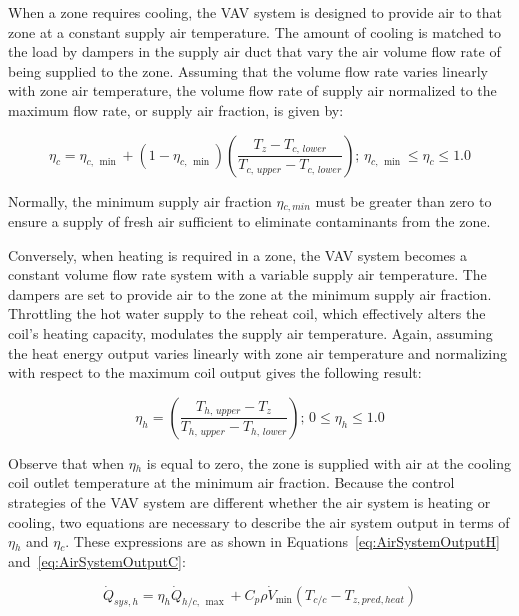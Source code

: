 When a zone requires cooling, the VAV system is designed to provide air to that zone at a constant supply air temperature. The amount of cooling is matched to the load by dampers in the supply air duct that vary the air volume flow rate of being supplied to the zone. Assuming that the volume flow rate varies linearly with zone air temperature, the volume flow rate of supply air normalized to the maximum flow rate, or supply air fraction, is given by:

\begin{equation}
{\eta_c} = {\eta_{c,\,\min }} + \left( {1 - {\eta_{c,\,\min }}} \right)\left( {\frac{{{T_z} - {T_{c,\,lower}}}}{{{T_{c,\,upper}} - {T_{c,\,lower}}}}} \right);\,{\eta_{c,\,\min }} \le {\eta_c} \le 1.0
\label{eq:NormalizedSupplyAirFlowC}
\end{equation}

Normally, the minimum supply air fraction $\eta$\(_{c,min}\) must be greater than zero to ensure a supply of fresh air sufficient to eliminate contaminants from the zone.

Conversely, when heating is required in a zone, the VAV system becomes a constant volume flow rate system with a variable supply air temperature. The dampers are set to provide air to the zone at the minimum supply air fraction. Throttling the hot water supply to the reheat coil, which effectively alters the coil's heating capacity, modulates the supply air temperature. Again, assuming the heat energy output varies linearly with zone air temperature and normalizing with respect to the maximum coil output gives the following result:

\begin{equation}
{\eta_h} = \left( {\frac{{{T_{h,\,upper}} - {T_z}}}{{{T_{h,\,upper}} - {T_{h,\,lower}}}}} \right);\,0 \le {\eta_h} \le 1.0
\label{eq:NormalizedSupplyAirFlowH}
\end{equation}

Observe that when $\eta$\(_{h}\) is equal to zero, the zone is supplied with air at the cooling coil outlet temperature at the minimum air fraction. Because the control strategies of the VAV system are different whether the air system is heating or cooling, two equations are necessary to describe the air system output in terms of $\eta$\(_{h}\) and $\eta$\(_{c}\). These expressions are as shown in Equations~\ref{eq:AirSystemOutputH} and~\ref{eq:AirSystemOutputC}:

\begin{equation}
{\dot Q_{sys,h}} = {\eta_h}{\dot Q_{h/c,\,\max }} + {C_p}\rho {\dot V_{\min }}\left( {{T_{c/c}} - {T_{z,pred,heat}}} \right)
\label{eq:AirSystemOutputH}
\end{equation}

